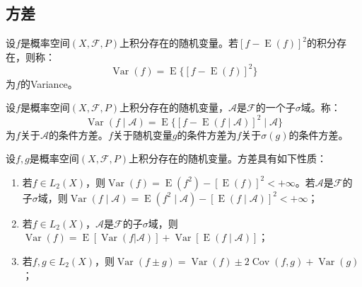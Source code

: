 \subsection{方差}
\begin{definition}
	设$f$是概率空间$(X,\mathscr{F},P)$上积分存在的随机变量。若$[f-\operatorname{E}(f)]^2$的积分存在，则称：
	\begin{equation*}
		\operatorname{Var}(f)=\operatorname{E}\{[f-\operatorname{E}(f)]^2\}
	\end{equation*}
	为$f$的\gls{Variance}。
\end{definition}
\begin{definition}
	设$f$是概率空间$(X,\mathscr{F},P)$上积分存在的随机变量，$\mathscr{A}$是$\mathscr{F}$的一个子$\sigma$域。称：
	\begin{equation*}
		\operatorname{Var}(f\mid\mathscr{A})=\operatorname{E}\{[f-\operatorname{E}(f\mid\mathscr{A})]^2\mid\mathscr{A}\}
	\end{equation*}
	为$f$关于$\mathscr{A}$的条件方差。$f$关于随机变量$g$的条件方差为$f$关于$\sigma(g)$的条件方差。
\end{definition}
\begin{property}\label{prop:Variance}
	设$f,g$是概率空间$(X,\mathscr{F},P)$上积分存在的随机变量。方差具有如下性质：
	\begin{enumerate}
		\item 若$f\in L_2(X)$，则$\operatorname{Var}(f)=\operatorname{E}(f^2)-[\operatorname{E}(f)]^2<+\infty$。若$\mathscr{A}$是$\mathscr{F}$的子$\sigma$域，则$\operatorname{Var}(f\mid\mathscr{A})=\operatorname{E}(f^2\mid\mathscr{A})-[\operatorname{E}(f\mid\mathscr{A})]^2<+\infty$；
		\item 若$f\in L_2(X)$，$\mathscr{A}$是$\mathscr{F}$的子$\sigma$域，则$\operatorname{Var}(f)=\operatorname{E}[\operatorname{Var}(f|\mathscr{A})]+\operatorname{Var}[\operatorname{E}(f\mid\mathscr{A})]$；
		\item 若$f,g\in L_2(X)$，则$\operatorname{Var}(f\pm g)=\operatorname{Var}(f)\pm2\operatorname{Cov}(f,g)+\operatorname{Var}(g)$；
	\end{enumerate}
\end{property}

